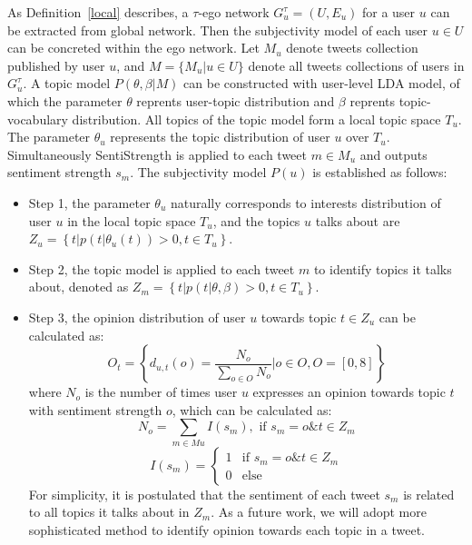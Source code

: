 \documentclass[letterpaper]{article}
\begin{document}
As Definition~\ref{local} describes, a $ \tau $-ego network $ G_{u}^{\tau}=\left( U,E_{u} \right)  $ for a user $ u $ can be extracted from global network. 
Then the subjectivity model of each user $ u \in U $ can be concreted within the ego network. 
Let $ M_{u}$ denote tweets collection published by user $ u $, and $ M=\lbrace M_{u} |u \in U \rbrace$ denote all tweets collections of users in $ G_{u}^{\tau} $. A topic model $P\left(\theta,\beta | M \right) $ can be constructed with user-level LDA model, of which the parameter $\theta$ reprents user-topic distribution and $\beta$ reprents topic-vocabulary distribution. All topics of the topic model form a local topic space $ T_{u} $. 
The parameter $ \theta_{u} $ represents the topic distribution of user $ u $ over $ T_{u} $. Simultaneously SentiStrength is applied to each tweet $ m \in M_{u} $ and outputs sentiment strength $ s_{m} $. 
The subjectivity model $P\left( u\right)  $ is established as follows:
\begin{itemize}
\item Step 1, the parameter $ \theta_{u} $ naturally corresponds to interests distribution of user $ u $ in the local topic space $ T_{u} $, and the topics $ u $ talks about are $ Z_{u}= \left\lbrace t \vert p\left( t \vert \theta_{u}\left( t \right)  \right)>0 , t \in T_{u}\right\rbrace $.
\item Step 2, the topic model is applied to each tweet $ m $ to identify topics it talks about, denoted as $ Z_{m} =\left\lbrace t \vert p\left( t \vert \theta, \beta \right)>0 , t \in T_{u} \right\rbrace $.
\item Step 3, the opinion distribution of user $ u $ towards topic $ t \in Z_{u} $ can be calculated as: 
\begin{equation}
\label{opinionall}
O_{t}= \left\lbrace d_{u,t}\left( o\right)= \dfrac{N_{o}}{\sum_{o \in O} N_{o}} |o \in O, O=\left[ 0,8 \right] \right\rbrace 
\end{equation}
where $ N_{o} $ is the number of times user $ u $ expresses an opinion towards topic $ t $ with sentiment strength $ o $, which can be calculated as:
\begin{equation}
\label{opinion1}
N_{o}=\sum_{m \in Mu} I\left( s_{m} \right) , \text{ if } s_{m}=o \& t \in Z_{m}
\end{equation}
\begin{equation}
\label{opinion2}
I\left( s_{m} \right)=\left\{
\begin{array}{ll}
{1} & \text{if } s_{m}=o \& t \in Z_{m}\\
{0} & \text{else}
\end{array}
\right.
\end{equation}
For simplicity, it is postulated that the sentiment of each tweet $ s_{m} $ is related to all topics it talks about in $ Z_{m} $. As a future work, we will adopt more sophisticated method to identify opinion towards each topic in a tweet.
\end{itemize}
\end{document}
